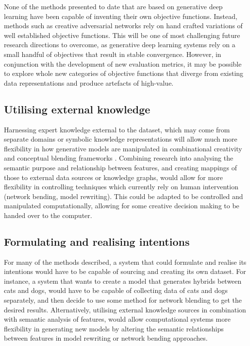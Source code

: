 None of the methods presented to date that are based on generative deep learning have been capable of inventing their own objective functions. Instead, methods such as creative adversarial networks \citep{elgammal2017can} rely on hand crafted variations of well established objective functions. This will be one of most challenging future research directions to overcome, as generative deep learning systems rely on a small handful of objectives that result in stable convergence. However, in conjunction with the development of new evaluation metrics, it may be possible to explore whole new categories of objective functions that diverge from existing data representations and produce artefacts of high-value. 

\subsection{Utilising external knowledge}
\label{future:external}
Harnessing expert knowledge external to the dataset, which may come from separate domains or symbolic knowledge representations will allow much more flexibility in how generative models are manipulated in combinational creativity \citep{boden2004creative} and conceptual blending frameworks \citep{fauconnier2008way}. Combining research into analysing the semantic purpose and relationship between features, and creating mappings of those to external data sources or knowledge graphs, would allow for more flexibility in controlling techniques which currently rely on human intervention (network bending, model rewriting). This could be adapted to be controlled and manipulated computationally, allowing for some creative decision making to be handed over to the computer.

\subsection{Formulating and realising intentions}

For many of the methods described, a system that could formulate and realise its intentions would have to be capable of sourcing and creating its own dataset. For instance, a system that wants to create a model that generates hybrids between cats and dogs, would have to be capable of collecting data of cats and dogs separately, and then decide to use some method for network blending to get the desired results. Alternatively, utilising external knowledge sources in combination with semantic analysis of features, would allow computational systems more flexibility in generating new models by altering the semantic relationships between features in model rewriting or network bending approaches. 

